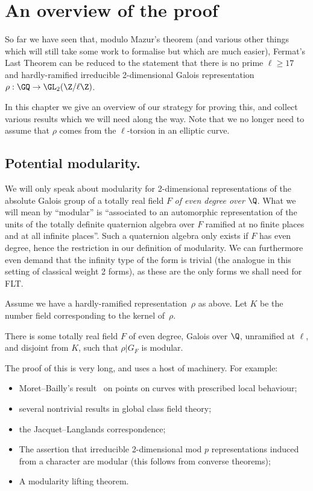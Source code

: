 \chapter{An overview of the proof}\label{ch_overview}

So far we have seen that, modulo Mazur's theorem (and various other things which will still take some work to formalise but which are much easier), Fermat's Last Theorem can be reduced
to the statement that there is no prime $\ell\geq 17$ and hardly-ramified
irreducible 2-dimensional Galois representation $\rho:\GQ\to\GL_2(\Z/\ell\Z)$.

In this chapter we give an overview of our strategy for proving this, and collect
various results which we will need along the way. Note that we no longer need to assume that $\rho$ comes from the $\ell$-torsion in an elliptic curve.

\section{Potential modularity.}

We will only speak about modularity for 2-dimensional representations of the
absolute Galois group of a totally real field $F$ \emph{of even degree over} $\Q$.
What we will mean by ``modular'' is ``associated to an automorphic representation of the
units of the totally definite quaternion algebra over $F$ ramified at no finite places
and at all infinite places''. Such a quaternion algebra only exists if $F$ has even degree,
hence the restriction in our definition of modularity.
We can furthermore even demand that the infinity type of the form is trivial (the analogue
in this setting of classical weight 2 forms), as these are the only forms we shall need for FLT.

Assume we have a hardly-ramified representation~$\rho$ as above. Let $K$
be the number field corresponding to the kernel of~$\rho$.

\begin{theorem}
    \label{potential_modularity}
    \notready
    There is some totally real field $F$ of even degree, Galois over $\Q$,
    unramified at $\ell$, and disjoint from $K$, such that $\rho|G_F$ is modular.
\end{theorem}

The proof of this is very long, and uses a host of machinery. For example:
\begin{itemize}
    \item Moret--Bailly's result~\cite{moret-bailly} on points on curves with prescribed
    local behaviour;
    \item several nontrivial results in global class field theory;
    \item the Jacquet--Langlands correspondence;
    \item The assertion that irreducible 2-dimensional mod $p$ representations induced from a character are modular (this follows from converse theorems);
    \item A modularity lifting theorem.
\end{itemize}

